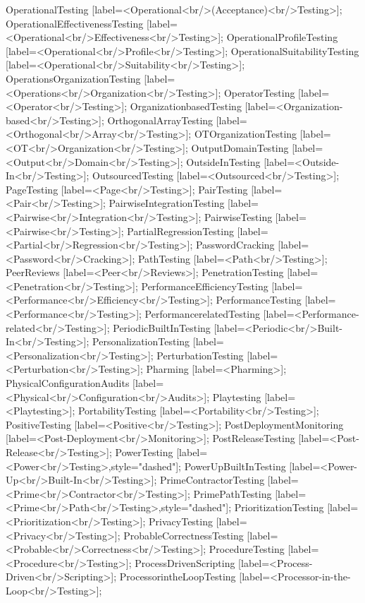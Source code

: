 \documentclass{article}
\begin{document}
{OperationalTesting [label=<Operational<br/>(Acceptance)<br/>Testing>];
OperationalEffectivenessTesting [label=<Operational<br/>Effectiveness<br/>Testing>];
OperationalProfileTesting [label=<Operational<br/>Profile<br/>Testing>];
OperationalSuitabilityTesting [label=<Operational<br/>Suitability<br/>Testing>];
OperationsOrganizationTesting [label=<Operations<br/>Organization<br/>Testing>];
OperatorTesting [label=<Operator<br/>Testing>];
OrganizationbasedTesting [label=<Organization-based<br/>Testing>];
OrthogonalArrayTesting [label=<Orthogonal<br/>Array<br/>Testing>];
OTOrganizationTesting [label=<OT<br/>Organization<br/>Testing>];
OutputDomainTesting [label=<Output<br/>Domain<br/>Testing>];
OutsideInTesting [label=<Outside-In<br/>Testing>];
OutsourcedTesting [label=<Outsourced<br/>Testing>];
PageTesting [label=<Page<br/>Testing>];
PairTesting [label=<Pair<br/>Testing>];
PairwiseIntegrationTesting [label=<Pairwise<br/>Integration<br/>Testing>];
PairwiseTesting [label=<Pairwise<br/>Testing>];
PartialRegressionTesting [label=<Partial<br/>Regression<br/>Testing>];
PasswordCracking [label=<Password<br/>Cracking>];
PathTesting [label=<Path<br/>Testing>];
PeerReviews [label=<Peer<br/>Reviews>];
PenetrationTesting [label=<Penetration<br/>Testing>];
PerformanceEfficiencyTesting [label=<Performance<br/>Efficiency<br/>Testing>];
PerformanceTesting [label=<Performance<br/>Testing>];
PerformancerelatedTesting [label=<Performance-related<br/>Testing>];
PeriodicBuiltInTesting [label=<Periodic<br/>Built-In<br/>Testing>];
PersonalizationTesting [label=<Personalization<br/>Testing>];
PerturbationTesting [label=<Perturbation<br/>Testing>];
Pharming [label=<Pharming>];
PhysicalConfigurationAudits [label=<Physical<br/>Configuration<br/>Audits>];
Playtesting [label=<Playtesting>];
PortabilityTesting [label=<Portability<br/>Testing>];
PositiveTesting [label=<Positive<br/>Testing>];
PostDeploymentMonitoring [label=<Post-Deployment<br/>Monitoring>];
PostReleaseTesting [label=<Post-Release<br/>Testing>];
PowerTesting [label=<Power<br/>Testing>,style="dashed"];
PowerUpBuiltInTesting [label=<Power-Up<br/>Built-In<br/>Testing>];
PrimeContractorTesting [label=<Prime<br/>Contractor<br/>Testing>];
PrimePathTesting [label=<Prime<br/>Path<br/>Testing>,style="dashed"];
PrioritizationTesting [label=<Prioritization<br/>Testing>];
PrivacyTesting [label=<Privacy<br/>Testing>];
ProbableCorrectnessTesting [label=<Probable<br/>Correctness<br/>Testing>];
ProcedureTesting [label=<Procedure<br/>Testing>];
ProcessDrivenScripting [label=<Process-Driven<br/>Scripting>];
ProcessorintheLoopTesting [label=<Processor-in-the-Loop<br/>Testing>];
}
\end{document}
